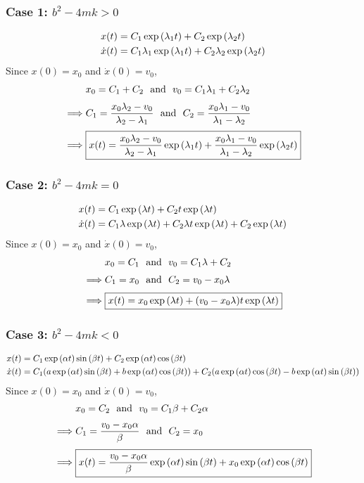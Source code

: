 \documentclass[12pt]{article}
\begin{document}
\subsubsection*{Case 1: $b^2 - 4mk > 0$}
\begin{align*}
	x(t) &= C_1\exp\qty(\lambda_1 t) + C_2\exp\qty(\lambda_2 t) \\
	\dot{x}(t) &= C_1\lambda_1\exp\qty(\lambda_1 t) + C_2\lambda_2\exp\qty(\lambda_2 t)
\end{align*}
Since $x(0) = x_0$ and $\dot{x}(0) = v_0$,
\begin{align*}
	&x_0 = C_1 + C_2\ \ \text{and}\ \ v_0 = C_1\lambda_1 + C_2\lambda_2 \\[.1cm]
	\implies &C_1 = \frac{x_0\lambda_2 - v_0}{\lambda_2 - \lambda_1}\ \ \text{and}\ \ C_2 = \frac{x_0\lambda_1 - v_0}{\lambda_1 - \lambda_2} \\[.1cm]
	\implies &\boxed{x(t) = \frac{x_0\lambda_2 - v_0}{\lambda_2 - \lambda_1}\exp\qty(\lambda_1 t) + \frac{x_0\lambda_1 - v_0}{\lambda_1 - \lambda_2}\exp\qty(\lambda_2 t)}
\end{align*}

\subsubsection*{Case 2: $b^2 - 4mk = 0$}
\begin{align*}
	x(t) &= C_1\exp\qty(\lambda t) + C_2t\exp\qty(\lambda t) \\
	\dot{x}(t) &= C_1\lambda\exp\qty(\lambda t) + C_2\lambda t\exp\qty(\lambda t) + C_2\exp\qty(\lambda t)
\end{align*}
Since $x(0) = x_0$ and $\dot{x}(0) = v_0$,
\begin{align*}
	&x_0 = C_1\ \ \text{and}\ \ v_0 = C_1\lambda + C_2 \\[.1cm]
	\implies &C_1 = x_0\ \ \text{and}\ \ C_2 = v_0 - x_0\lambda \\[.1cm]
	\implies &\boxed{x(t) = x_0\exp\qty(\lambda t) + (v_0 - x_0\lambda)t\exp\qty(\lambda t)}
\end{align*}

\subsubsection*{Case 3: $b^2 - 4mk < 0$}
\begin{align*}
	x(t) &= C_1\exp\qty(\alpha t)\sin\qty(\beta t) + C_2\exp\qty(\alpha t)\cos\qty(\beta t) \\
	\dot{x}(t) &= C_1\qty(a\exp\qty(\alpha t)\sin\qty(\beta t) + b\exp\qty(\alpha t)\cos\qty(\beta t)) + C_2\qty(a\exp\qty(\alpha t)\cos\qty(\beta t) - b\exp\qty(\alpha t)\sin\qty(\beta t))
\end{align*}
Since $x(0) = x_0$ and $\dot{x}(0) = v_0$,
\begin{align*}
	&x_0 = C_2\ \ \text{and}\ \ v_0 = C_1 \beta + C_2 \alpha \\[.1cm]
	\implies &C_1 = \frac{v_0 - x_0 \alpha}{\beta}\ \ \text{and}\ \ C_2 = x_0 \\[.1cm]
	\implies &\boxed{x(t) = \frac{v_0 - x_0 \alpha}{\beta}\exp\qty(\alpha t)\sin\qty(\beta t) + x_0\exp\qty(\alpha t)\cos\qty(\beta t)}
\end{align*}
\end{document}
